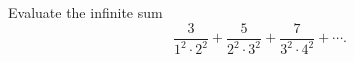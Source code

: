 Evaluate the infinite sum
\[
\dfrac{3}{1^2\cdot2^2}+\dfrac{5}{2^2\cdot3^2}+\dfrac{7}{3^2\cdot4^2}+\cdots .
\]
